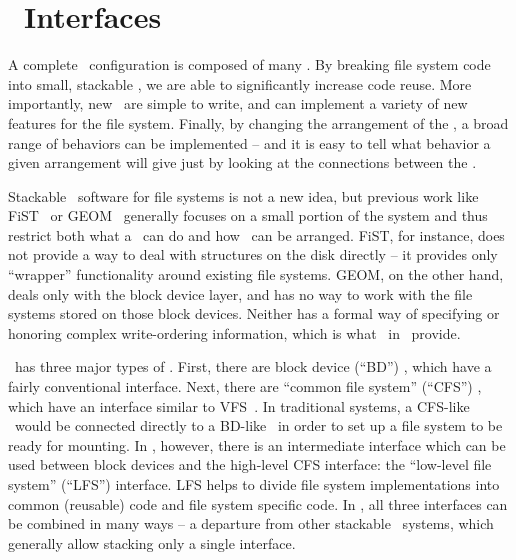 \section {\Module\ Interfaces}
\label{sec:interfaces}

A complete \Kudos\ configuration is composed of many \modules. By breaking file
system code into small, stackable \modules, we are able to significantly
increase code reuse. More importantly, new \modules\ are simple to write, and
can implement a variety of new features for the file system. Finally, by
changing the arrangement of the \modules, a broad range of behaviors can be
implemented -- and it is easy to tell what behavior a given arrangement will
give just by looking at the connections between the \modules.


Stackable \module\ software for file systems is not a new idea, but previous
work like FiST~\cite{zadok00fist} or GEOM~\cite{geom} generally focuses on a
small portion of the system and thus restrict both what a \module\ can do and
how \modules\ can be arranged. FiST, for instance, does not provide a way to
deal with structures on the disk directly -- it provides only ``wrapper''
functionality around existing file systems. GEOM, on the other hand, deals only
with the block device layer, and has no way to work with the file systems stored
on those block devices. Neither has a formal way of specifying or honoring
complex write-ordering information, which is what \chdescs\ in \Kudos\ provide.

\Kudos\ has three major types of \modules. First, there are block device
(``BD'') \modules, which have a fairly conventional interface. Next, there are
``common file system'' (``CFS'') \modules, which have an interface similar to
VFS~\cite{kleiman86vnodes}. In traditional systems, a CFS-like \module\ would be
connected directly to a BD-like \module\ in order to set up a file system to be
ready for mounting. In \Kudos, however, there is an intermediate interface which
can be used between block devices and the high-level CFS interface: the
``low-level file system'' (``LFS'') interface. LFS helps to divide file system
implementations into common (reusable) code and file system specific code. In
\Kudos, all three interfaces can be combined in many ways -- a departure from
other stackable \module\ systems, which generally allow stacking only a single
interface.

